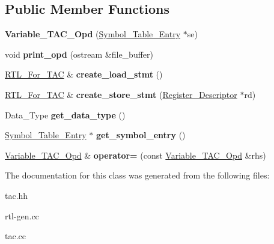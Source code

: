 \subsection*{Public Member Functions}
\begin{DoxyCompactItemize}
\item 
\mbox{\label{classVariable__TAC__Opd_a1c3cb50446b0221732dcc7c7a6a824ff}} 
{\bfseries Variable\+\_\+\+T\+A\+C\+\_\+\+Opd} (\hyperlink{classSymbol__Table__Entry}{Symbol\+\_\+\+Table\+\_\+\+Entry} $\ast$se)
\item 
\mbox{\label{classVariable__TAC__Opd_aaffd650c0409d27442dbc5dcd6470907}} 
void {\bfseries print\+\_\+opd} (ostream \&file\+\_\+buffer)
\item 
\mbox{\label{classVariable__TAC__Opd_a9b48571715517d4a90757547c65c974d}} 
\hyperlink{classRTL__For__TAC}{R\+T\+L\+\_\+\+For\+\_\+\+T\+AC} \& {\bfseries create\+\_\+load\+\_\+stmt} ()
\item 
\mbox{\label{classVariable__TAC__Opd_a7adcc7fa77debcc37e85dc52e1399a4c}} 
\hyperlink{classRTL__For__TAC}{R\+T\+L\+\_\+\+For\+\_\+\+T\+AC} \& {\bfseries create\+\_\+store\+\_\+stmt} (\hyperlink{classRegister__Descriptor}{Register\+\_\+\+Descriptor} $\ast$rd)
\item 
\mbox{\label{classVariable__TAC__Opd_a72c450bb0d3eca2425cecec218cb1d28}} 
Data\+\_\+\+Type {\bfseries get\+\_\+data\+\_\+type} ()
\item 
\mbox{\label{classVariable__TAC__Opd_a7636c44f58a2d3e7e587b0d3595ca5c2}} 
\hyperlink{classSymbol__Table__Entry}{Symbol\+\_\+\+Table\+\_\+\+Entry} $\ast$ {\bfseries get\+\_\+symbol\+\_\+entry} ()
\item 
\mbox{\label{classVariable__TAC__Opd_a12dae8d8c3c840a938760eb22cf41104}} 
\hyperlink{classVariable__TAC__Opd}{Variable\+\_\+\+T\+A\+C\+\_\+\+Opd} \& {\bfseries operator=} (const \hyperlink{classVariable__TAC__Opd}{Variable\+\_\+\+T\+A\+C\+\_\+\+Opd} \&rhs)
\end{DoxyCompactItemize}


The documentation for this class was generated from the following files\+:\begin{DoxyCompactItemize}
\item 
tac.\+hh\item 
rtl-\/gen.\+cc\item 
tac.\+cc\end{DoxyCompactItemize}
